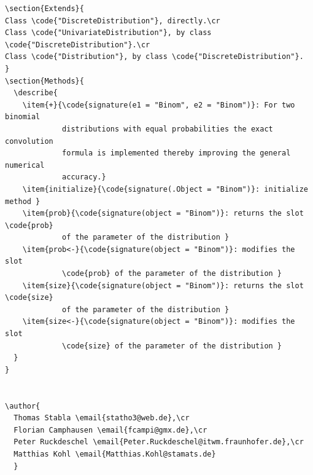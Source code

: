 \documentclass[10pt]{article}
\let\code\lstinline
\begin{document}
\begin{enumerate}
\begin{itemize}
\begin{lstlisting}[style=Rdstyle]
\section{Extends}{
Class \code{"DiscreteDistribution"}, directly.\cr
Class \code{"UnivariateDistribution"}, by class \code{"DiscreteDistribution"}.\cr
Class \code{"Distribution"}, by class \code{"DiscreteDistribution"}.
}
\section{Methods}{
  \describe{
    \item{+}{\code{signature(e1 = "Binom", e2 = "Binom")}: For two binomial 
             distributions with equal probabilities the exact convolution 
             formula is implemented thereby improving the general numerical 
             accuracy.}
    \item{initialize}{\code{signature(.Object = "Binom")}: initialize method }
    \item{prob}{\code{signature(object = "Binom")}: returns the slot \code{prob} 
             of the parameter of the distribution }
    \item{prob<-}{\code{signature(object = "Binom")}: modifies the slot 
             \code{prob} of the parameter of the distribution }
    \item{size}{\code{signature(object = "Binom")}: returns the slot \code{size} 
             of the parameter of the distribution }
    \item{size<-}{\code{signature(object = "Binom")}: modifies the slot 
             \code{size} of the parameter of the distribution }
  }
}


\author{
  Thomas Stabla \email{statho3@web.de},\cr 
  Florian Camphausen \email{fcampi@gmx.de},\cr
  Peter Ruckdeschel \email{Peter.Ruckdeschel@itwm.fraunhofer.de},\cr 
  Matthias Kohl \email{Matthias.Kohl@stamats.de}
  }



\end{lstlisting}
\end{itemize}
\end{enumerate}
\end{document}
